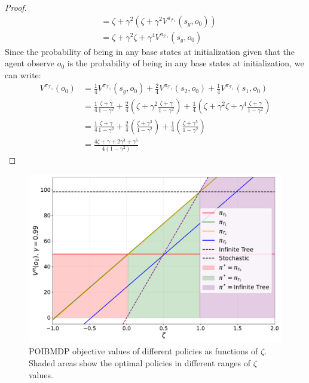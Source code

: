 \begin{proof}
\begin{align*}
    &= \zeta + \gamma^2 (\zeta + \gamma^2 V^{\pi_{\mathcal{T}_1}} (s_g, o_0)) \\
    &= \zeta + \gamma^2 \zeta + \gamma^4 V^{\pi_{\mathcal{T}_1}} (s_g, o_0)
\end{align*}
Since the probability of being in any base states at initialization given that the agent observe $o_0$ is the probability of being in any base states at initialization, we can write:
\begin{align*}
    V^{\pi_{\mathcal{T}_1}} (o_0) &= \frac{1}{4} V^{\pi_{\mathcal{T}_1}} (s_g, o_0) + \frac{2}{4} V^{\pi_{\mathcal{T}_1}} (s_2, o_0) + \frac{1}{4} V^{\pi_{\mathcal{T}_1}} (s_1, o_0) \\
    &= \frac{1}{4} \frac{\zeta + \gamma}{1 - \gamma^2} + \frac{2}{4} (\zeta + \gamma^2 \frac{\zeta + \gamma}{1 - \gamma^2}) + \frac{1}{4} (\zeta + \gamma^2 \zeta + \gamma^4 \frac{\zeta + \gamma}{1 - \gamma^2}) \\
    &= \frac{1}{4} \frac{\zeta + \gamma}{1 - \gamma^2} + \frac{2}{4} (\frac{\zeta + \gamma ^ 3}{1-\gamma^2}) + \frac{1}{4}(\frac{\zeta+\gamma^5}{1-\gamma^2}) \\
    &= \frac{4\zeta + \gamma + 2\gamma^3 + \gamma^5}{4(1-\gamma^2)}
\end{align*}
\end{proof}


\begin{figure}
    \centering
    \includegraphics[width=1\textwidth]{images/images_part1/objective_values_plot.pdf}
    \caption{POIBMDP objective values of different policies as functions of $\zeta$. Shaded areas show the optimal policies in different ranges of $\zeta$ values.}\label{fig:objectives}
\end{figure}

